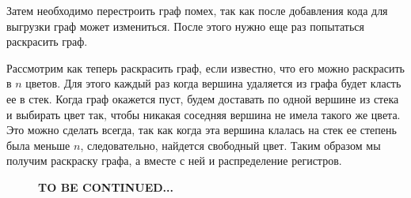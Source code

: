 \documentclass[12pt]{article}
\begin{document}
Затем необходимо перестроить граф помех, так как после добавления кода для выгрузки граф может измениться. После этого нужно
еще раз попытаться раскрасить граф.

Рассмотрим как теперь раскрасить граф, если известно, что его можно раскрасить в $n$ цветов. Для этого каждый раз когда
вершина удаляется из графа будет класть ее в стек. Когда граф окажется пуст, будем доставать по одной вершине из стека
и выбирать цвет так, чтобы никакая соседняя вершина не имела такого же цвета. Это можно сделать всегда, так как когда
эта вершина клалась на стек ее степень была меньше $n$, следовательно, найдется свободный цвет. Таким образом мы получим
раскраску графа, а вместе с ней и распределение регистров.

\begin{figure}[H]
    \centering
    \textbf{TO BE CONTINUED...}
\end{figure}
\end{document}
